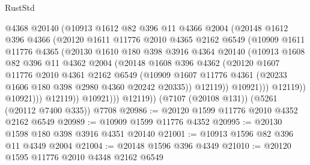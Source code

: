 \begin{lexlean}{RustStd}
\begin{coremodule}
                      @4368
                      @20140
                      (@10913
                        @1612
                        @82
                        @396
                        @11
                        @4366
                        @2004
                        (@20148
                          @1612
                          @396
                          @4366
                          (@20120
                            @1611
                            @11776
                            @2010
                            @4365
                            @2162
                            @6549
                            (@10909
                              @1611
                              @11776
                              @4365
                              (@20130
                                @1610
                                @180
                                @398
                                @3916
                                @4364
                                @20140
                                (@10913
                                  @1608
                                  @82
                                  @396
                                  @11
                                  @4362
                                  @2004
                                  (@20148
                                    @1608
                                    @396
                                    @4362
                                    (@20120
                                      @1607
                                      @11776
                                      @2010
                                      @4361
                                      @2162
                                      @6549
                                      (@10909
                                        @1607
                                        @11776
                                        @4361
                                        (@20233 @1606 @180 @398 @2980 @4360 @20242 @20335))
                                      @12119))
                                  @10921)))
                            @12119))
                        @10921)))
                  @12119))
              @10921)))
        @12119))
    (@7107 (@20108 @131))
    (@5261 (@20112 @7400 @335))
    @7708
@20986 := @20120 @1599 @11776 @2010 @4352 @2162 @6549
@20989 := @10909 @1599 @11776 @4352
@20995 := @20130 @1598 @180 @398 @3916 @4351 @20140
@21001 := @10913 @1596 @82 @396 @11 @4349 @2004
@21004 := @20148 @1596 @396 @4349
@21010 := @20120 @1595 @11776 @2010 @4348 @2162 @6549

\end{coremodule}
\end{lexlean}
